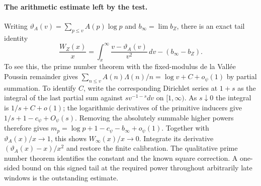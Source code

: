 \paragraph{The arithmetic estimate left by the test.}
Writing \(\vartheta_A(v)=\sum_{p\le v}A(p)\log p\) and
\(b_\infty=\lim b_Z\), there is an exact tail identity
\[
 \frac{W_Z(x)}x
 =\int_x^\infty\frac{v-\vartheta_A(v)}{v^2}\,dv-(b_\infty-b_Z).
\]
To see this, the prime number theorem with the fixed-modulus
de la Vall\'ee Poussin remainder gives
\(\sum_{n\le v}A(n)\Lambda(n)/n=\log v+C+o_\psi(1)\)
by partial summation. To identify \(C\), write the corresponding
Dirichlet series at \(1+s\) as the integral of the last partial sum
against \(s v^{-1-s}dv\) on \([1,\infty)\).
As \(s\downarrow0\) the integral is \(1/s+C+o(1)\);
the logarithmic derivatives of the primitive inducers give
\(1/s+1-c_\psi+O_\psi(s)\). Removing the absolutely summable
higher powers therefore gives
\(m_p=\log p+1-c_\psi-b_\infty+o_\psi(1)\).
Together with \(\vartheta_A(x)/x\to1\), this shows
\(W_\infty(x)/x\to0\). Integrate its derivative
\((\vartheta_A(x)-x)/x^2\) and restore the finite calibration.
The qualitative prime number theorem identifies the constant and
the known square correction. A one-sided bound on this signed
tail at the required power throughout arbitrarily late windows is
the outstanding estimate.

